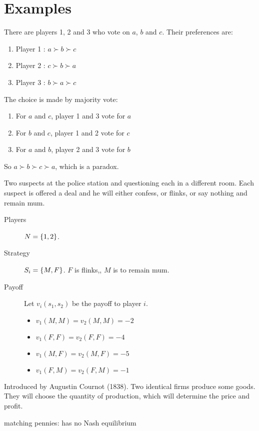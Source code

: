 \section{Examples}


\begin{example}
    There are players 1, 2 and 3 who vote on $a$, $b$ and $c$. Their preferences are:
    \begin{enumerate}
        \item Player 1 : $a \succ b \succ c$
        \item Player 2 : $c \succ b \succ a$
        \item Player 3 : $b \succ a \succ c$
    \end{enumerate}
    The choice is made by majority vote:
    \begin{enumerate}
        \item For $a$ and $c$, player 1 and 3 vote for $a$
        \item For $b$ and $c$, player 1 and 2 vote for $c$
        \item For $a$ and $b$, player 2 and 3 vote for $b$
    \end{enumerate}
    So $a \succ b \succ c \succ a$, which is a paradox.
\end{example}

\begin{example}
    Two suspects at the police station and questioning each in a different room. Each suspect is offered a deal and he will either confess, or flinks, or say nothing and remain mum.
    \begin{description}
        \item [Players] $N = \set{1,2}$.
        \item [Strategy] $S_i = \set{M, F}$. $F$ is flinks,, $M$ is to remain mum.
        \item [Payoff] Let $v_i(s_1, s_2)$ be the payoff to player $i$. \begin{itemize}
            \item $v_1 (M,M) = v_2(M,M) = -2$
            \item $v_1 (F,F) = v_2(F,F) = -4$
            \item $v_1 (M,F) = v_2(M,F) = -5$
            \item $v_1 (F,M) = v_2(F,M) = -1$
        \end{itemize}
    \end{description}
\end{example}

\begin{example}
    Introduced by Augustin Cournot (1838). Two identical firms produce some goods. They will choose the quantity of production, which will determine the price and profit.
\end{example}

matching pennies: has no Nash equilibrium

